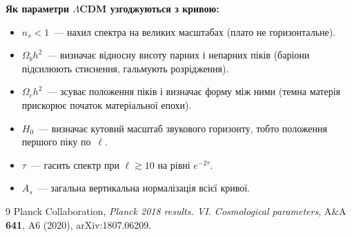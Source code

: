 \documentclass[12pt, a4paper]{article}
\begin{document}
\begin{keybox}
\textbf{Як параметри $\Lambda$CDM узгоджуються з кривою:}
\begin{itemize}
  \item $n_s < 1$~--- нахил спектра на великих масштабах (плато не горизонтальне).
  \item $\Omega_b h^2$~--- визначає відносну висоту парних і непарних піків
        (баріони підсилюють стиснення, гальмують розрідження).
  \item $\Omega_c h^2$~--- зсуває положення піків і визначає форму між ними
        (темна матерія прискорює початок матеріальної епохи).
  \item $H_0$~--- визначає кутовий масштаб звукового горизонту,
        тобто положення першого піку по~$\ell$.
  \item $\tau$~--- гасить спектр при $\ell \gtrsim 10$ на рівні $e^{-2\tau}$.
  \item $A_s$~--- загальна вертикальна нормалізація всієї кривої.
\end{itemize}
\end{keybox}

\begin{thebibliography}{9}
  Planck Collaboration,
  \textit{Planck 2018 results. VI. Cosmological parameters},
  A\&A \textbf{641}, A6 (2020),
  arXiv:1807.06209.
\end{thebibliography}

%
%
\end{document}

